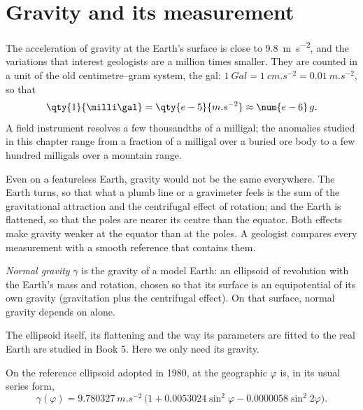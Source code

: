 \section{Gravity and its measurement}

The acceleration of gravity at the Earth's surface is close to
\qty{9.8}{m.s^{-2}}, and the variations that interest geologists are a
million times smaller. They are counted in a unit of the old centimetre--gram
system, the gal: $\qty{1}{Gal} = \qty{1}{cm.s^{-2}} = \qty{0.01}{m.s^{-2}}$, so
that
\[
  \qty{1}{\milli\gal} = \qty{e-5}{m.s^{-2}} \approx \num{e-6}\,g .
\]
A field instrument resolves a few thousandths of a milligal; the anomalies
studied in this chapter range from a fraction of a milligal over a buried ore
body to a few hundred milligals over a mountain range.

Even on a featureless Earth, gravity would not be the same everywhere. The
Earth turns, so that what a plumb line or a gravimeter feels is the sum of the
gravitational attraction and the centrifugal effect of rotation; and the
Earth is flattened, so that the poles are nearer its centre than the equator.
Both effects make gravity weaker at the equator than at the poles. A geologist
compares every measurement with a smooth reference that contains them.

\begin{definition}\label{def:b1:isostasy-gravity:normal-gravity}
\emph{Normal gravity} $\gamma$ is the gravity of a model
Earth: an ellipsoid of revolution with the Earth's mass and rotation, chosen so
that its surface is an equipotential of its own gravity (gravitation plus the
centrifugal effect). On that surface, normal gravity depends on  alone.
\end{definition}

The ellipsoid itself, its flattening and the way its parameters are fitted to
the real Earth are studied in Book 5. Here we only need its gravity.

\begin{proposition}\label{prop:b1:isostasy-gravity:normal-formula}
On the reference ellipsoid adopted in 1980,  at the geographic
 $\varphi$ is, in its usual series form,
\[
  \gamma(\varphi) = \qty{9.780327}{m.s^{-2}}\,\bigl(1 + 0.0053024\sin^2\varphi
  - 0.0000058\sin^2 2\varphi\bigr).
\]
\end{proposition}
\admitted

